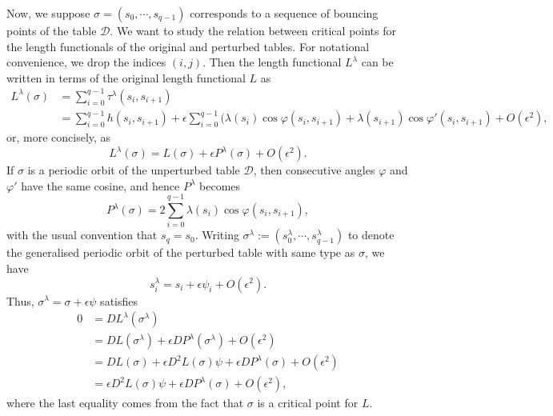 \documentclass[reqno,11pt]{amsart}
\begin{document}
Now, we suppose \( \sigma = (s_0, \cdots, s_{q-1}) \) corresponds to a sequence of bouncing points of the table \( \mathcal{D} \).
We want to study the relation between critical points for the length functionals of the original and perturbed tables.
For notational convenience, we drop the indices \( (i,j) \).
Then the length functional \( L^\lambda \) can be written in terms of the original length functional \( L \) as
\begin{align*}
    L^\lambda(\sigma) &= \sum_{i=0}^{q-1}\tau^\lambda(s_i, s_{i+1}) \\
    &= \sum_{i=0}^{q-1}h(s_i, s_{i+1}) + \epsilon\sum_{i=0}^{q-1}(\lambda(s_i)\cos\varphi(s_i, s_{i+1}) + \lambda(s_{i+1})\cos\varphi'(s_i,s_{i+1}) + O(\epsilon^2),
\end{align*}
or, more concisely, as
\begin{equation}\label{eq:pert_len_func}
    L^\lambda(\sigma) = L(\sigma) + \epsilon P^\lambda(\sigma) + O(\epsilon^2).   
\end{equation}
If \( \sigma \) is a periodic orbit of the unperturbed table \( \mathcal{D} \), then consecutive angles \( \varphi \) and \( \varphi' \) have the same cosine, and hence \( P^\lambda \) becomes
\begin{equation}\label{eq:descrip_Plamb_per_point}
    P^\lambda(\sigma) = 2\sum_{i=0}^{q-1}\lambda(s_i)\cos\varphi(s_i, s_{i+1}),
\end{equation}
with the usual convention that \( s_q = s_0 \). 
Writing \( \sigma^\lambda := (s_0^\lambda, \cdots, s^\lambda_{q-1}) \) to denote the generalised periodic orbit of the perturbed table with same type as \( \sigma \), we have 
\begin{equation*}
    s_i^\lambda = s_i + \epsilon\psi_i + O(\epsilon^2).
\end{equation*}
Thus, \( \sigma^\lambda = \sigma + \epsilon\psi \) satisfies
\begin{equation}\label{eq:per_orb_perturb}
\begin{split}
    0 &= DL^\lambda(\sigma^\lambda) \\
    &= DL(\sigma^\lambda) + \epsilon DP^\lambda(\sigma^\lambda) + O(\epsilon^2) \\
    &= DL(\sigma) + \epsilon D^2L(\sigma)\psi + \epsilon DP^\lambda(\sigma) + O(\epsilon^2) \\
    &= \epsilon D^2L(\sigma)\psi + \epsilon DP^\lambda(\sigma) + O(\epsilon^2),
\end{split}
\end{equation}
where the last equality comes from the fact that \( \sigma \) is a critical point for \( L \).
\end{document}
